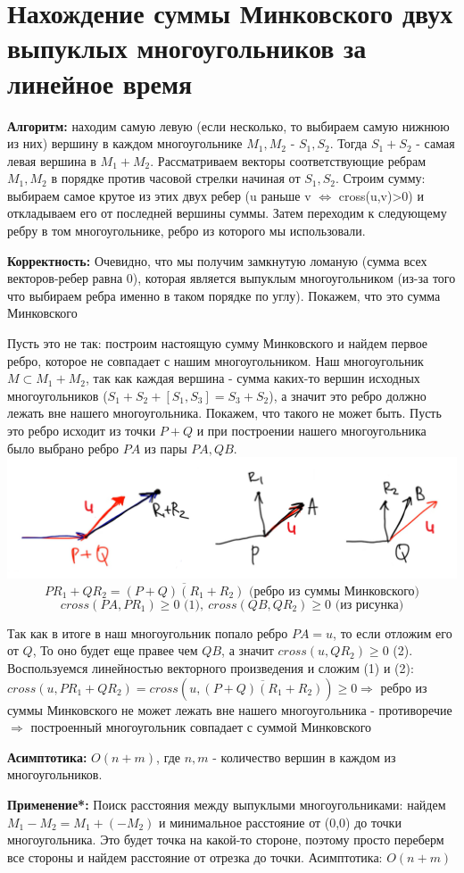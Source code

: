 \section{Нахождение суммы Минковского двух выпуклых многоугольников за линейное время}
\par \textbf{Алгоритм:} находим самую левую (если несколько, то выбираем самую нижнюю из них) вершину в каждом многоугольнике $M_1, M_2$ - $S_1, S_2$. Тогда $S_1+S_2$ - самая левая вершина в $M_1+M_2$. Рассматриваем векторы соответствующие ребрам $M_1,M_2$ в порядке против часовой стрелки начиная от $S_1, S_2$. Строим сумму: выбираем самое крутое из этих двух ребер (u раньше v $\Leftrightarrow$ cross(u,v)>0) и откладываем его от последней вершины суммы. Затем переходим к следующему ребру в том многоугольнике, ребро из которого мы использовали.
\par \textbf{Корректность:} Очевидно, что мы получим замкнутую ломаную (сумма всех векторов-ребер равна 0), которая является выпуклым многоугольником (из-за того что выбираем ребра именно в таком порядке по углу). Покажем, что это сумма Минковского
\par Пусть это не так: построим настоящую сумму Минковского и найдем первое ребро, которое не совпадает с нашим многоугольником. Наш многоугольник $M \subset M_1+M_2$, так как каждая вершина - сумма каких-то вершин исходных многоугольников ($S_1+S_2+[S_1, S_3]=S_3+S_2$), а значит это ребро должно лежать вне нашего многоугольника. Покажем, что такого не может быть. Пусть это ребро исходит из точки $P+Q$ и при построении нашего многоугольника было выбрано ребро $PA$ из пары $PA, QB$.
\includegraphics[width=17cm]{images/minkovsky.png}
$$PR_1+QR_2=\overline{(P+Q)(R_1+R_2)} \text{ (ребро из суммы Минковского)}$$
$$cross(PA, PR_1)\geq 0 \text{ (1)}, \: cross(QB,QR_2) \geq 0 \text{ (из рисунка)}$$
\par Так как в итоге в наш многоугольник попало ребро $PA=u$, то если отложим его от $Q$, То оно будет еще правее чем $QB$, а значит $cross(u, QR_2)\geq 0$ (2). Воспользуемся линейностью векторного произведения и сложим (1) и (2): $cross(u, PR_1+QR_2)=cross(u, \overline{(P+Q)(R_1+R_2)})\geq 0 \Rightarrow$ ребро из суммы Минковского не может лежать вне нашего многоугольника - противоречие $\Rightarrow$ построенный многоугольник совпадает с суммой Минковского
\par \textbf{Асимптотика:} $O(n+m)$, где $n,m$ - количество вершин в каждом из многоугольников.
\par \textbf{Применение*:} Поиск расстояния между выпуклыми многоугольниками: найдем $M_1-M_2=M_1+(-M_2)$ и минимальное расстояние от (0,0) до точки многоугольника. Это будет точка на какой-то стороне, поэтому просто переберм все стороны и найдем расстояние от отрезка до точки. Асимптотика: $O(n+m)$ 
\newpage{}

